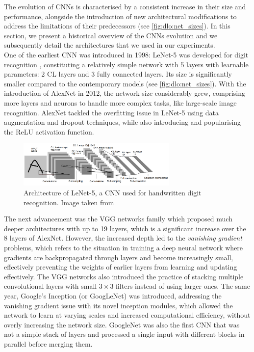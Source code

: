 The evolution of \aclp{CNN} is characterised by a consistent increase in their
size and performance, alongside the introduction of new architectural
modifications to address the limitations of their predecessors (see
\cref{fig:dlo:net_sizes}). In this section, we present a historical overview of
the \acp{CNN} evolution and we subsequently detail the architectures that we
used in our experiments.\\

One of the earliest \ac{CNN} was introduced in 1998: LeNet-5 was developed for
digit recognition \cite{DBLP:journals/pieee/LeCunBBH98}, constituting a
relatively simple network with 5 layers with learnable parameters: 2 \ac{CL}
layers and 3 fully connected layers. Its size is significantly smaller compared
to the contemporary models (see \cref{fig:dlo:net_sizes}). With the introduction
of AlexNet \cite{DBLP:conf/nips/KrizhevskySH12} in 2012, the network size
considerably grew, comprising more layers and neurons to handle more complex
tasks, like large-scale image recognition. AlexNet tackled the overfitting
issue in LeNet-5 using data augmentation and dropout techniques, while also
introducing and popularising the \ac{ReLU} activation function.\\

\begin{figure}[htbp]
  \centering
  \includegraphics[width=0.70\textwidth]{chapter_sota/assets/lenet.png}
  \caption{Architecture of LeNet-5, a \acl{CNN} used for handwritten digit
    recognition. Image taken from \cite{DBLP:journals/pieee/LeCunBBH98}}
  \label{fig:dlo:lenet5}
\end{figure}


The next advancement was the VGG networks family
\cite{DBLP:journals/corr/SimonyanZ14a} %
which proposed much deeper architectures with up to 19 layers, which is a
significant increase over the 8 layers of AlexNet. However, the increased depth
led to the \emph{vanishing gradient} problems, which refers to the situation in
training a deep neural network where gradients are backpropagated through layers
and become increasingly small, effectively preventing the weights of earlier
layers from learning and updating effectively. The VGG networks also introduced
the practice of stacking multiple convolutional layers with small $3\times 3$
filters instead of using larger ones. The same year, Google's Inception (or
GoogLeNet) \cite{DBLP:conf/cvpr/SzegedyLJSRAEVR15} was introduced, addressing
the vanishing gradient issue with its novel inception modules, which allowed
the network to learn at varying scales and increased computational efficiency,
without overly increasing the network size. GoogleNet was also the first
\ac{CNN} that was not a simple stack of layers and processed a single input with
different blocks in parallel before merging them.\\

